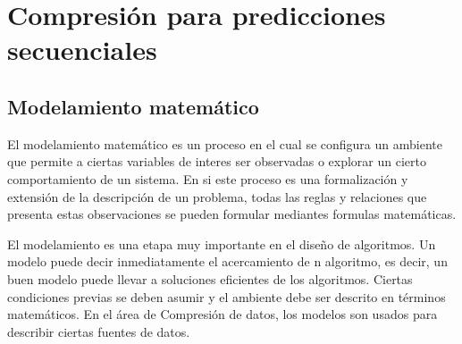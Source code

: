 \uncm
\section{Compresión para predicciones secuenciales}\label{ch2:compressdata-predict-seq}


\uncm



\subsection{Modelamiento matemático}\label{sec-ldc-model-math}

El modelamiento matemático es un proceso en el cual se configura un ambiente que permite a ciertas variables de interes ser observadas o explorar un cierto comportamiento  de un sistema. En si este proceso es una formalización y extensión de la descripción de un problema, todas las reglas y relaciones que presenta estas observaciones se pueden formular mediantes formulas matemáticas.

El modelamiento es una etapa muy importante en el diseño de algoritmos. Un modelo puede decir inmediatamente el acercamiento de n algoritmo, es decir, un  buen modelo puede llevar a soluciones eficientes de los algoritmos. Ciertas condiciones previas se deben asumir y el ambiente debe ser descrito  en términos matemáticos. En el área de Compresión de datos, los modelos son usados para describir ciertas fuentes de datos.



